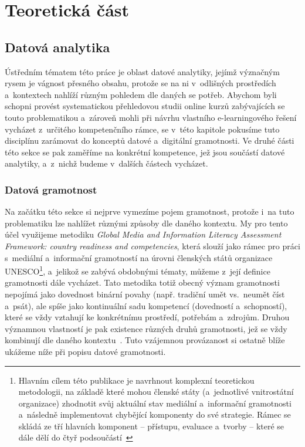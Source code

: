 \part{Teoretická část}

\hypertarget{datovuxe1-analytika}{%
\chapter{Datová analytika}\label{datovuxe1-analytika}}

Ústředním tématem této práce je oblast datové analytiky, jejímž význačným rysem je vágnost přesného obsahu, protože se na ni v~odlišných prostředích a~kontextech nahlíží různým pohledem dle daných se potřeb. Abychom byli schopni provést systematickou přehledovou studii online kurzů zabývajících se touto problematikou a~zároveň mohli při návrhu vlastního e-learningového řešení vycházet z~určitého kompetenčního rámce, se v~této kapitole pokusíme tuto disciplínu zarámovat do konceptů datové a~digitální gramotnosti. Ve druhé části této sekce se pak zaměříme na konkrétní kompetence, jež jsou součástí datové analytiky, a~z~nichž budeme v~dalších částech vycházet.

\hypertarget{datovuxe1-gramotnost}{%
\section{Datová gramotnost}\label{datovuxe1-gramotnost}}

Na začátku této sekce si nejprve vymezíme pojem gramotnost, protože i~na tuto problematiku lze nahlížet různými způsoby dle daného kontextu. My pro tento účel využijeme metodiku \emph{Global Media and Information Literacy Assessment Framework: country readiness and competencies}, která slouží jako rámec pro práci s~mediální a~informační gramotností na úrovni členských států organizace UNESCO\footnote{Hlavním cílem této publikace je navrhnout komplexní teoretickou metodologii, na základě které mohou členské státy (a~jednotlivé vnitrostátní organizace) zhodnotit svůj aktuální stav mediální a~informační gramotnosti a~následně implementovat chybějící komponenty do své strategie. Rámec se skládá ze tří hlavních komponent – přístupu, evaluace a~tvorby – které se dále dělí do čtyř podsoučástí~\parencite{unesco13}}, a~jelikož se zabývá obdobnými tématy, můžeme z~její definice gramotnosti dále vycházet. Tato metodika totiž obecný význam gramotnosti nepojímá jako dovednost binární povahy (např. tradiční umět vs.~neumět číst a~psát), ale spíše jako kontinuální sadu kompetencí (dovedností a~schopností), které se vždy vztahují ke konkrétnímu prostředí, potřebám a~zdrojům. Druhou významnou vlastností je pak existence různých druhů gramotnosti, jež se vždy kombinují dle daného kontextu~\parencite{unesco13}. Tuto vzájemnou provázanost si ostatně blíže ukážeme níže při popisu datové gramotnosti.

